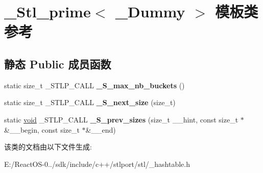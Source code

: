 \hypertarget{class___stl__prime}{}\section{\+\_\+\+Stl\+\_\+prime$<$ \+\_\+\+Dummy $>$ 模板类 参考}
\label{class___stl__prime}
\subsection*{静态 Public 成员函数}
\begin{DoxyCompactItemize}
\item 
\mbox{\label{class___stl__prime_a4771aa650314bc6f940d824b007ecc0f}} 
static size\+\_\+t \+\_\+\+S\+T\+L\+P\+\_\+\+C\+A\+LL {\bfseries \+\_\+\+S\+\_\+max\+\_\+nb\+\_\+buckets} ()
\item 
\mbox{\label{class___stl__prime_a53fd72cf1e00adcd76a0cf549c004c77}} 
static size\+\_\+t \+\_\+\+S\+T\+L\+P\+\_\+\+C\+A\+LL {\bfseries \+\_\+\+S\+\_\+next\+\_\+size} (size\+\_\+t)
\item 
\mbox{\label{class___stl__prime_a0f3315a0f0bf7e2a1016345921573317}} 
static \hyperlink{interfacevoid}{void} \+\_\+\+S\+T\+L\+P\+\_\+\+C\+A\+LL {\bfseries \+\_\+\+S\+\_\+prev\+\_\+sizes} (size\+\_\+t \+\_\+\+\_\+hint, const size\+\_\+t $\ast$\&\+\_\+\+\_\+begin, const size\+\_\+t $\ast$\&\+\_\+\+\_\+end)
\end{DoxyCompactItemize}


该类的文档由以下文件生成\+:\begin{DoxyCompactItemize}
\item 
E\+:/\+React\+O\+S-\/0../sdk/include/c++/stlport/stl/\+\_\+hashtable.\+h\end{DoxyCompactItemize}
